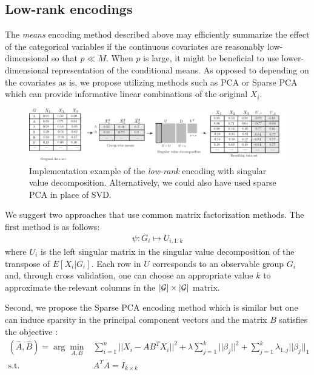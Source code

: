 \documentclass{article}
\theoremstyle{plain}
\theoremstyle{definition}
\theoremstyle{remark}
\begin{document}
\subsection{Low-rank encodings}
\label{subsec:lowrank}


The \emph{means} encoding method described above may efficiently summarize the effect of the categorical variables if the continuous covariates are reasonably low-dimensional so that $p \ll M$. When $p$ is large, it might be beneficial to use lower-dimensional representation of the conditional means. As opposed to depending on the covariates as is, we propose utilizing methods such as PCA or Sparse PCA \cite{zou2006sparse} which can provide informative linear combinations of the original $X_{i}$.


\begin{figure}[H]
  \centering
  \includegraphics[width=\textwidth]{figures/lowrank_encoding.pdf}
  \caption{Implementation example of the \emph{low-rank} encoding with singular value decomposition. Alternatively, we could also have used sparse PCA in place of SVD.}
  \label{fig:lowrank_encoding}
\end{figure}

We suggest two approaches that use common matrix factorization methods. The first method is as follows:
\begin{align}
\psi: G_{i} \mapsto U_{i,1:k} \label{eq:svd}
\end{align}
where $U_i$ is the left singular matrix in the singular value decomposition of the transpose of $E[X_i|G_i]$. Each row in $U$ corresponds to an observable group $G_i$ and, through cross validation, one can choose an appropriate value $k$ to approximate the relevant columns in the $|\mathcal{G}| \times |\mathcal{G}|$ matrix.

Second, we propose the Sparse PCA encoding method which is similar but one can induce sparsity in the principal component vectors and the matrix $B$ satisfies the objective \cite{zou2006sparse}:
\begin{align}
    (\hat{A},\hat{B}) = \arg\min_{A,B} &\sum_{i=1}^n ||X_i - AB^TX_i||^2+ \lambda \sum_{j=1}^k ||\beta_j ||^2 + \sum_{j=1}^k \lambda_{1,j} ||\beta_j||_1\\
    \text{s.t.} \quad & A^TA = I_{k \times k}
    \label{eq:sparse_pca}
\end{align}
\end{document}
